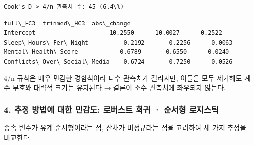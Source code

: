 \documentclass[11pt]{article}
\makeatletter
\newcommand{\boxspacing}{\kern\kvtcb@left@rule\kern\kvtcb@boxsep}
\newcommand{\prompt}[4]{
        {\ttfamily\llap{{\color{#2}[#3]:\hspace{3pt}#4}}\vspace{-\baselineskip}}
    }
\makeatother
\begin{document}
    \begin{Verbatim}[commandchars=\\\{\}]
Cook's D > 4/n 관측치 수: 45 (6.4\%)
    \end{Verbatim}

            \begin{tcolorbox}[breakable, size=fbox, boxrule=.5pt, pad at break*=1mm, opacityfill=0]
\prompt{Out}{outcolor}{22}{\boxspacing}
\begin{Verbatim}[commandchars=\\\{\}]
                             full\_HC3  trimmed\_HC3  abs\_change
Intercept                     10.2550      10.0027      0.2522
Sleep\_Hours\_Per\_Night         -0.2192      -0.2256      0.0063
Mental\_Health\_Score           -0.6789      -0.6550      0.0240
Conflicts\_Over\_Social\_Media    0.6724       0.7250      0.0526
\end{Verbatim}
\end{tcolorbox}
        
    4/n 규칙은 매우 민감한 경험칙이라 다수 관측치가 걸리지만, 이들을 모두
제거해도 계수 부호와 대략적 크기는 유지된다 → 결론이 소수 관측치에
좌우되지 않는다.

    \hypertarget{uxcd94uxc815-uxbc29uxbc95uxc5d0-uxb300uxd55c-uxbbfcuxac10uxb3c4-uxb85cuxbc84uxc2a4uxd2b8-uxd68cuxadc0-uxc21cuxc11cuxd615-uxb85cuxc9c0uxc2a4uxd2f1}{%
\subsubsection{4. 추정 방법에 대한 민감도: 로버스트 회귀 · 순서형
로지스틱}\label{uxcd94uxc815-uxbc29uxbc95uxc5d0-uxb300uxd55c-uxbbfcuxac10uxb3c4-uxb85cuxbc84uxc2a4uxd2b8-uxd68cuxadc0-uxc21cuxc11cuxd615-uxb85cuxc9c0uxc2a4uxd2f1}}

종속 변수가 유계 순서형이라는 점, 잔차가 비정규라는 점을 고려하여 세
가지 추정을 비교한다.
\end{document}
